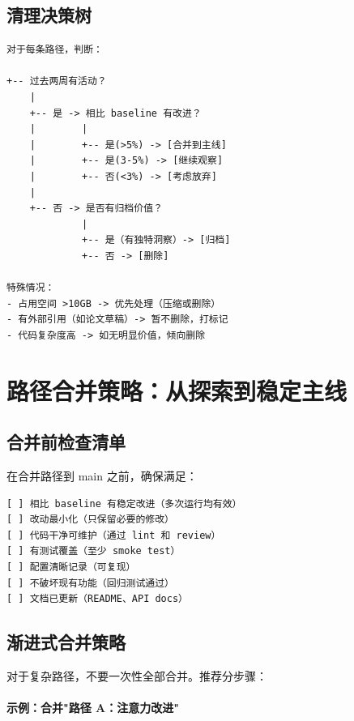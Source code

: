 \subsection{清理决策树}

\begin{verbatim}
对于每条路径，判断：

+-- 过去两周有活动？
    |
    +-- 是 -> 相比 baseline 有改进？
    |        |
    |        +-- 是(>5%) -> [合并到主线]
    |        +-- 是(3-5%) -> [继续观察]
    |        +-- 否(<3%) -> [考虑放弃]
    |
    +-- 否 -> 是否有归档价值？
             |
             +-- 是（有独特洞察）-> [归档]
             +-- 否 -> [删除]

特殊情况：
- 占用空间 >10GB -> 优先处理（压缩或删除）
- 有外部引用（如论文草稿）-> 暂不删除，打标记
- 代码复杂度高 -> 如无明显价值，倾向删除
\end{verbatim}

\section{路径合并策略：从探索到稳定主线}

\subsection{合并前检查清单}

在合并路径到 main 之前，确保满足：

\begin{verbatim}
[ ] 相比 baseline 有稳定改进（多次运行均有效）
[ ] 改动最小化（只保留必要的修改）
[ ] 代码干净可维护（通过 lint 和 review）
[ ] 有测试覆盖（至少 smoke test）
[ ] 配置清晰记录（可复现）
[ ] 不破坏现有功能（回归测试通过）
[ ] 文档已更新（README、API docs）
\end{verbatim}

\subsection{渐进式合并策略}

对于复杂路径，不要一次性全部合并。推荐分步骤：

\paragraph{示例：合并"路径 A：注意力改进"}

